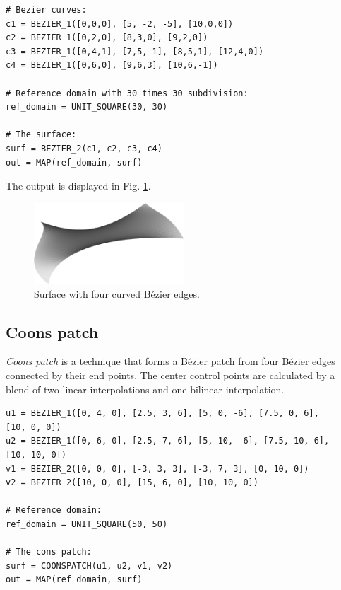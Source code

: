 \begin{bbox}
\begin{verbatim}
# Bezier curves:
c1 = BEZIER_1([0,0,0], [5, -2, -5], [10,0,0])
c2 = BEZIER_1([0,2,0], [8,3,0], [9,2,0])
c3 = BEZIER_1([0,4,1], [7,5,-1], [8,5,1], [12,4,0])
c4 = BEZIER_1([0,6,0], [9,6,3], [10,6,-1])

# Reference domain with 30 times 30 subdivision:
ref_domain = UNIT_SQUARE(30, 30)

# The surface:
surf = BEZIER_2(c1, c2, c3, c4)
out = MAP(ref_domain, surf)
\end{verbatim}
\end{bbox}
\vspace{6mm}

\noindent
The output is displayed in Fig. \ref{fig:bezi}.

\begin{figure}[!ht]
\begin{center}
\includegraphics[width=0.5\textwidth]{img/bezi.png}
\end{center}
\vspace{-4mm}
\caption{Surface with four curved B\'ezier edges.}
\label{fig:bezi}
\end{figure}

\subsection{Coons patch}

{\em Coons patch} is a technique that forms a B\'ezier patch from four B\'ezier edges connected 
by their end points. The center control 
points are calculated by a blend of two linear interpolations and one bilinear interpolation.\\

\begin{bbox}
\begin{verbatim}
u1 = BEZIER_1([0, 4, 0], [2.5, 3, 6], [5, 0, -6], [7.5, 0, 6], 
[10, 0, 0])
u2 = BEZIER_1([0, 6, 0], [2.5, 7, 6], [5, 10, -6], [7.5, 10, 6], 
[10, 10, 0])
v1 = BEZIER_2([0, 0, 0], [-3, 3, 3], [-3, 7, 3], [0, 10, 0])
v2 = BEZIER_2([10, 0, 0], [15, 6, 0], [10, 10, 0])

# Reference domain:
ref_domain = UNIT_SQUARE(50, 50)

# The cons patch:
surf = COONSPATCH(u1, u2, v1, v2)
out = MAP(ref_domain, surf)
\end{verbatim}
\end{bbox}
\vspace{6mm}

